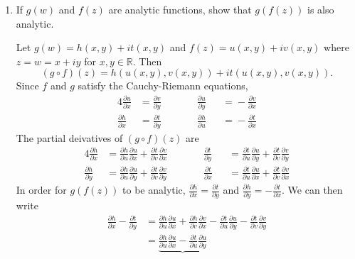 \begin{enumerate}
\item
  If \(g(w)\) and \(f(z)\) are analytic functions, show that \(g(f(z))\) is
  also analytic.
  \par\smallskip
  Let \(g(w) = h(x,y) + it(x,y)\) and \(f(z) = u(x,y) + iv(x,y)\) where
  \(z = w = x + iy\) for \(x,y\in\mathbb{R}\).
  Then
  \[
  (g\circ f)(z) = h(u(x, y), v(x, y)) + it(u(x, y), v(x, y)).
  \]
  Since \(f\) and \(g\) satisfy the Cauchy-Riemann equations,
  \begin{alignat*}{4}
    \frac{\partial u}{\partial x} & = \frac{\partial v}{\partial y} & \qquad &
    \frac{\partial u}{\partial y} && ={} -\frac{\partial v}{\partial x}\\
    \frac{\partial h}{\partial x} & = \frac{\partial t}{\partial y} & \qquad &
    \frac{\partial h}{\partial u} && ={} -\frac{\partial t}{\partial x}
  \end{alignat*}
  The partial deivatives of \((g\circ f)(z)\) are
  \begin{alignat*}{4}
    \frac{\partial h}{\partial x}
    & = \frac{\partial h}{\partial u}\frac{\partial u}{\partial x} +
    \frac{\partial t}{\partial v}\frac{\partial v}{\partial x} & \qquad &
    \frac{\partial t}{\partial y}
    && ={} \frac{\partial t}{\partial u}\frac{\partial u}{\partial y} +
    \frac{\partial t}{\partial v}\frac{\partial v}{\partial y}\\
    \frac{\partial h}{\partial y}
    & = \frac{\partial h}{\partial u}\frac{\partial u}{\partial y} +
    \frac{\partial t}{\partial v}\frac{\partial v}{\partial y} & \qquad &
    \frac{\partial t}{\partial x}
    && ={} \frac{\partial t}{\partial u}\frac{\partial u}{\partial x} +
    \frac{\partial t}{\partial v}\frac{\partial v}{\partial x}
  \end{alignat*}
  In order for \(g(f(z))\) to be analytic,
  \(\frac{\partial h}{\partial x} = \frac{\partial t}{\partial y}\) and
  \(\frac{\partial h}{\partial y} = -\frac{\partial t}{\partial x}\).
  We can then write
  \begin{align*}
    \frac{\partial h}{\partial x} - \frac{\partial t}{\partial y}
    & = \frac{\partial h}{\partial u}\frac{\partial u}{\partial x} +
      \frac{\partial h}{\partial v}\frac{\partial v}{\partial x} -
      \frac{\partial t}{\partial u}\frac{\partial u}{\partial y} -
      \frac{\partial t}{\partial v}\frac{\partial v}{\partial y}\\
    & = \underbrace{\frac{\partial h}{\partial u}\frac{\partial u}{\partial x}
      - \frac{\partial t}{\partial u}\frac{\partial u}{\partial y}}_{
}
\end{align*}
\end{enumerate}
